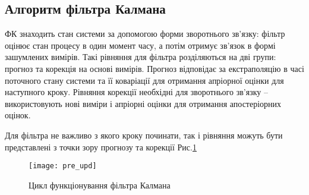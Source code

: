 \subsection{Алгоритм фільтра Калмана}

ФК знаходить стан системи за допомогою форми зворотнього зв'язку: фільтр
оцінює стан процесу в один момент часу, а потім отримує зв'язок в формі
зашумлених вимірів. Такі рівняння для фільтра розділяються на дві групи: 
прогноз та корекція на основі вимірів. Прогноз відповідає за екстраполяцію
в часі поточного стану системи та її коваріації для отримання апріорної
оцінки для наступного кроку. Рівняння корекції необхідні для зворотнього
зв'язку -- використовують нові виміри і апріорні оцінки для отримання 
апостеріорних оцінок.

Для фільтра не важливо з якого кроку починати, так і рівняння можуть бути 
представлені з точки зору прогнозу та корекції Рис.\ref{fig:basic_cycle}
\begin{figure}[here]
\centering
\texttt{[image: pre\_upd]}
\caption{Цикл функціонування фільтра Калмана }
\label{fig:basic_cycle}
\end{figure} 

